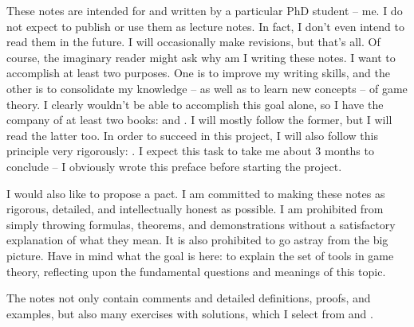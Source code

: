 \documentclass[../main.tex]{subfiles}
\begin{document}
These notes are intended for and written by a particular PhD student -- me. I do not expect to publish or use them as lecture notes. In fact, I don't even intend to read them in the future. I will occasionally make revisions, but that's all. Of course, the imaginary reader might ask why am I writing these notes. I want to accomplish at least two purposes. One is to improve my writing skills, and the other is to consolidate my knowledge -- as well as to learn new concepts -- of game theory. I clearly wouldn't be able to accomplish this goal alone, so I have the company of at least two books: \cite{OR} and \cite{FT}. I will mostly follow the former, but I will read the latter too. In order to succeed in this project, I will also follow this principle very rigorously: . I expect this task to take me about 3 months to conclude -- I obviously wrote this preface before starting the project.

I would also like to propose a pact. I am committed to making these notes as rigorous, detailed, and intellectually honest as possible. I am prohibited from simply throwing formulas, theorems, and demonstrations without a satisfactory explanation of what they mean. It is also prohibited to go astray from the big picture. Have in mind what the goal is here: to explain the set of tools in game theory, reflecting upon the fundamental questions and meanings of this topic.

The notes not only contain comments and detailed definitions, proofs, and examples, but also many exercises with solutions, which I select from \cite{OR} and \cite{FT}.
\end{document}
